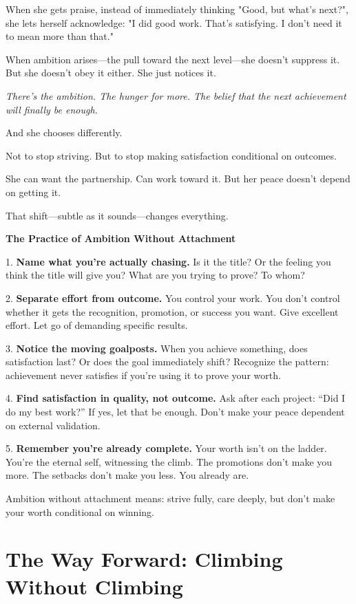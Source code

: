 \documentclass[11pt,twoside]{book}
\begin{document}
When she gets praise, instead of immediately thinking "Good, but what's next?", she lets herself acknowledge: "I did good work. That's satisfying. I don't need it to mean more than that."

When ambition arises—the pull toward the next level—she doesn't suppress it. But she doesn't obey it either. She just notices it.

\emph{There's the ambition. The hunger for more. The belief that the next achievement will finally be enough.}

And she chooses differently.

Not to stop striving. But to stop making satisfaction conditional on outcomes.

She can want the partnership. Can work toward it. But her peace doesn't depend on getting it.

That shift—subtle as it sounds—changes everything.

\begin{practicebox}
\textbf{The Practice of Ambition Without Attachment}

1. \textbf{Name what you're actually chasing.} Is it the title? Or the feeling you think the title will give you? What are you trying to prove? To whom?

2. \textbf{Separate effort from outcome.} You control your work. You don't control whether it gets the recognition, promotion, or success you want. Give excellent effort. Let go of demanding specific results.

3. \textbf{Notice the moving goalposts.} When you achieve something, does satisfaction last? Or does the goal immediately shift? Recognize the pattern: achievement never satisfies if you're using it to prove your worth.

4. \textbf{Find satisfaction in quality, not outcome.} Ask after each project: ``Did I do my best work?'' If yes, let that be enough. Don't make your peace dependent on external validation.

5. \textbf{Remember you're already complete.} Your worth isn't on the ladder. You're the eternal self, witnessing the climb. The promotions don't make you more. The setbacks don't make you less. You already are.

Ambition without attachment means: strive fully, care deeply, but don't make your worth conditional on winning.
\end{practicebox}

\section*{The Way Forward: Climbing Without Climbing}
\end{document}
